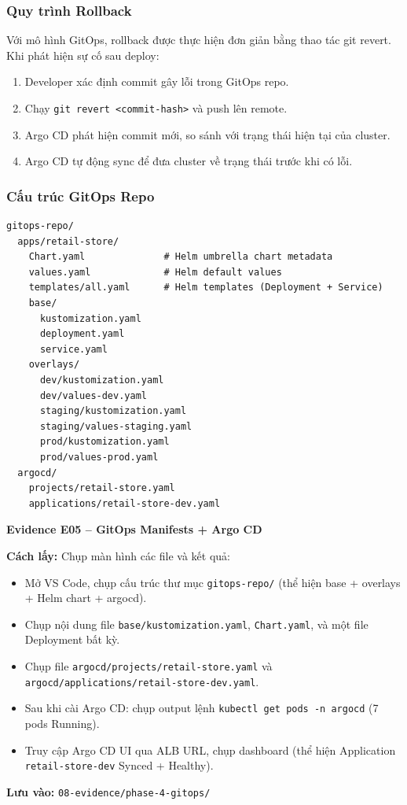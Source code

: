\documentclass[13pt,a4paper,twoside]{extarticle}
\newcommand{\evidence}[1]{%
  \begin{evidencebox}
  #1
  \end{evidencebox}
}
\begin{document}
\subsubsection{Quy trình Rollback}

Với mô hình GitOps, rollback được thực hiện đơn giản bằng thao tác git revert. Khi phát hiện sự cố sau deploy:

\begin{enumerate}[leftmargin=*,nosep]
  \item Developer xác định commit gây lỗi trong GitOps repo.
  \item Chạy \texttt{git revert <commit-hash>} và push lên remote.
  \item Argo CD phát hiện commit mới, so sánh với trạng thái hiện tại của cluster.
  \item Argo CD tự động sync để đưa cluster về trạng thái trước khi có lỗi.
\end{enumerate}

\subsubsection{Cấu trúc GitOps Repo}

\begin{verbatim}
gitops-repo/
  apps/retail-store/
    Chart.yaml              # Helm umbrella chart metadata
    values.yaml             # Helm default values
    templates/all.yaml      # Helm templates (Deployment + Service)
    base/
      kustomization.yaml
      deployment.yaml
      service.yaml
    overlays/
      dev/kustomization.yaml
      dev/values-dev.yaml
      staging/kustomization.yaml
      staging/values-staging.yaml
      prod/kustomization.yaml
      prod/values-prod.yaml
  argocd/
    projects/retail-store.yaml
    applications/retail-store-dev.yaml
\end{verbatim}

\evidence{
\textbf{Evidence E05 -- GitOps Manifests + Argo CD}

\smallskip
\textbf{Cách lấy:} Chụp màn hình các file và kết quả:
\begin{itemize}[leftmargin=*,nosep]
  \item Mở VS Code, chụp cấu trúc thư mục \texttt{gitops-repo/} (thể hiện base + overlays + Helm chart + argocd).
  \item Chụp nội dung file \texttt{base/kustomization.yaml}, \texttt{Chart.yaml}, và một file Deployment bất kỳ.
  \item Chụp file \texttt{argocd/projects/retail-store.yaml} và \texttt{argocd/applications/retail-store-dev.yaml}.
  \item Sau khi cài Argo CD: chụp output lệnh \texttt{kubectl get pods -n argocd} (7 pods Running).
  \item Truy cập Argo CD UI qua ALB URL, chụp dashboard (thể hiện Application \texttt{retail-store-dev} Synced + Healthy).
\end{itemize}
\textbf{Lưu vào:} \texttt{08-evidence/phase-4-gitops/}
}
\end{document}
